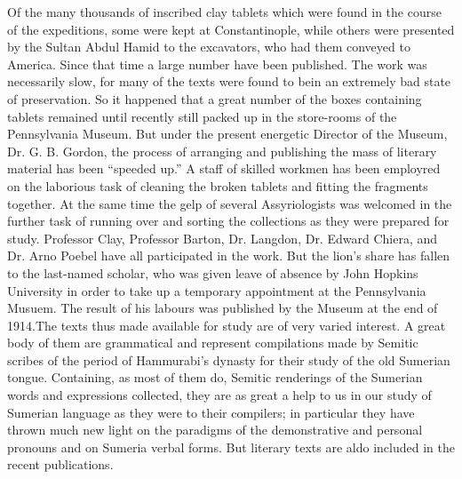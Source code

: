 \documentclass[12pt,oneside]{book}
\begin{document}
Of the many thousands of inscribed clay tablets which were found in the course of the expeditions, some were kept at Constantinople, while others were presented by the Sultan Abdul Hamid to the excavators, who had them conveyed to America. Since that time a large number have been published. The  work was necessarily slow, for many of the texts were found to bein an extremely bad state of preservation. So it happened that a great number of the boxes containing tablets remained until recently still packed up in the store-rooms of the Pennsylvania Museum. But under the present energetic Director of the Museum, Dr. G. B. Gordon, the process of arranging and publishing the mass of literary material has been ``speeded up.'' A staff of skilled workmen has been employred on the laborious task of cleaning the broken tablets and fitting the fragments together. At the same time the gelp of several Assyriologists was welcomed in the further task of running over and sorting the collections as they were prepared for study. Professor Clay, Professor Barton, Dr. Langdon, Dr. Edward Chiera, and Dr. Arno Poebel have all participated in the work. But the lion's share has fallen to the last-named scholar, who was given leave of absence by John Hopkins University in order to take up a temporary appointment at the Pennsylvania Musuem. The result of his labours was published by the Museum at the end of 1914.\footnotemark The texts thus made available for study are of very varied interest. A great body of them are grammatical and represent compilations made by Semitic scribes of the period of Hammurabi's dynasty for their study of the old Sumerian tongue. Containing, as most of them do, Semitic renderings of the Sumerian words and expressions collected, they are as great a help to us in our study of Sumerian language as they were to their compilers; in particular they have thrown much new light on the paradigms of the demonstrative and personal pronouns and on Sumeria verbal forms. But literary texts are aldo included in the recent publications. \par 

\end{document}
